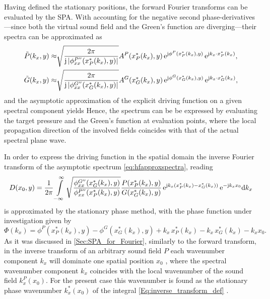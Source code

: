 Having defined the stationary positions, the forward Fourier transforms can be evaluated by the SPA. 
With accounting for the negative second phase-derivatives---since both the virtual sound field and the Green's function are diverging---their spectra can be approximated as \cite[Ch. 5]{Tracy2014}
\begin{align}
\tilde{P}(k_x,y) \approx& \sqrt{\frac{2\pi}{\mathrm{j} \, |\phi^{P''}_{xx}(x^*_P(k_x),y)|}} A^P(x^*_P(k_x),y) \, \mathrm{e}^{\mathrm{j} \phi^P(x^*_P(k_x),y)} \, \mathrm{e}^{\mathrm{j} k_x \cdot x^*_P(k_x)},\\
\tilde{G}(k_x,y) \approx& \sqrt{\frac{2\pi}{\mathrm{j} \, |\phi^{G''}_{xx}(x^*_G(k_x),y)|}} A^G(x^*_G(k_x),y) \, \mathrm{e}^{\mathrm{j} \phi^G(x^*_G(k_x),y)} \, \mathrm{e}^{\mathrm{j} k_x \cdot x^*_G(k_x)},
\end{align}
and the asymptotic approximation of the explicit driving function on a given spectral component yields
Hence, the spectrum can be be expressed by evaluating the target pressure and the Green's function at evaluation points, where the local propagation direction of the involved fields coincides with that of the actual spectral plane wave.

In order to express the driving function in the spatial domain the inverse Fourier transform of the asymptotic spectrum \eqref{eq:hfapproxspectra}, reading
%
\begin{equation}
\label{Eq:inverse_transform_def}
D(x_0,y)
=  \frac{1}{2\pi} \int\limits_{-\infty}^{\infty}
\sqrt{\frac{\phi^{G''}_{xx}(x^*_G(k_x),y)}{\phi^{P''}_{xx}(x^*_P(k_x),y)}} 
\frac{P(x^*_P(k_x),y)}{G(x^*_G(k_x),y)}
\,\mathrm{e}^{\mathrm{j} k_x \left( x^*_P(k_x) - x^*_G(k_x)\right)}
\,\mathrm{e}^{-\mathrm{j} k_x x_0} \mathrm{d} k_x
\end{equation}
is approximated by the stationary phase method, with the phase function under investigation given by
\begin{equation}
\label{Eq:inverse_transform_phase_function}
{\Phi}(k_x) = \phi^P(x^*_P(k_x),y) -  \phi^G(x^*_G(k_x),y) +  k_x \, x^*_P(k_x) - k_x\, x^*_G(k_x) -  k_x x_0.
\end{equation}
%
As it was discussed in \ref{Sec:SPA_for_Fourier}, similarly to the forward transform, in the inverse transform of an arbitrary sound field $P$ each wavenumber component $k_x$ will dominate one spatial position $x_0$ , where the spectral wavenumber component $k_x$ coincides with the local wavenumber of the sound field $k^P_x(x_0)$.
For the present case this wavenumber is found as the stationary phase wavenumber $k_x^*(x_0)$ of the integral \eqref{Eq:inverse_transform_def} \cite{Tracy2014}.

